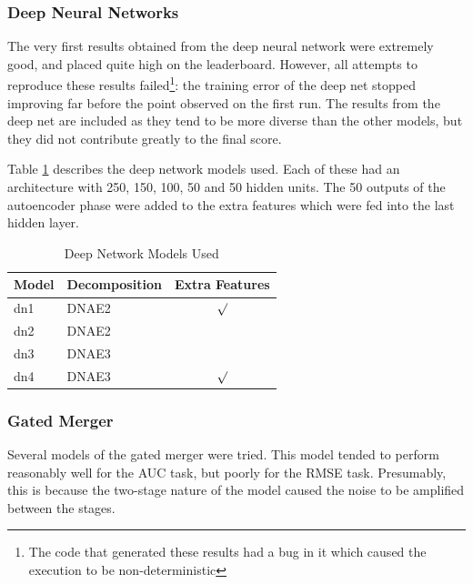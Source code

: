 \documentclass{article}
\begin{document}
\subsubsection{Deep Neural Networks}

The very first results obtained from the deep neural network were extremely good, and placed quite high on the leaderboard.  However, all attempts to reproduce these results failed\footnote{The code that generated these results had a bug in it which caused the execution to be non-deterministic}: the training error of the deep net stopped improving far before the point observed on the first run.  The results from the deep net are included as they tend to be more diverse than the other models, but they did not contribute greatly to the final score.

Table \ref{table:deep-net-models} describes the deep network models used.  Each of these had an architecture with 250, 150, 100, 50 and 50 hidden units.  The 50 outputs of the autoencoder phase were added to the extra features which were fed into the last hidden layer.

\begin{table}
\caption{Deep Network Models Used}
\label{table:deep-net-models}
\vskip 0.15in
\begin{center}
\begin{small}
\begin{sc}
\begin{tabular}{llc}
\hline
\abovespace\belowspace
Model & Decomposition & Extra Features \\
\hline
\abovespace
dn1   & DNAE2  & $\surd$  \\
dn2   & DNAE2  &   \\
dn3   & DNAE3  &   \\
\belowspace
dn4   & DNAE3  & $\surd$  \\
\hline
\end{tabular}
\end{sc}
\end{small}
\end{center}
\vskip -0.1in
\end{table}



\subsubsection{Gated Merger}

Several models of the gated merger were tried.  This model tended to perform reasonably well for the AUC task, but poorly for the RMSE task.  Presumably, this is because the two-stage nature of the model caused the noise to be amplified between the stages.
\end{document}

